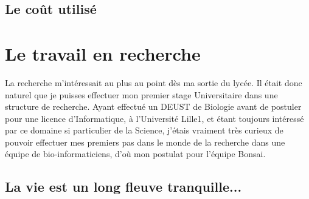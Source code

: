 \documentclass[12pt]{report}
\begin{document}
\begin{spacing}{1.2}
\section{Le coût utilisé}

\chapter{Le travail en recherche}

La recherche m'intéressait au plus au point dès ma sortie du lycée.
\newline
Il était donc naturel que je puisses effectuer mon premier stage Universitaire dans une structure de recherche. Ayant effectué un DEUST de Biologie avant de postuler pour une licence d'Informatique, à l'Université Lille1, et étant toujours intéressé par ce domaine si particulier de la Science, j'étais vraiment très curieux de pouvoir effectuer mes premiers pas dans le monde de la recherche dans une équipe de bio-informaticiens, d'où mon postulat pour l'équipe Bonsai.

\section{La vie est un long fleuve tranquille...}


\end{spacing}
\end{document}
